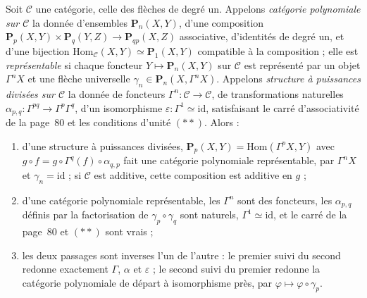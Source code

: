 \begin{encadre}
\begin{theoreme*}
Soit $\mathcal C$ une catégorie, celle des flèches de degré un. Appelons \emph{catégorie polynomiale sur $\mathcal C$} la donnée d'ensembles $\mathbf P_n(X, Y)$, d'une composition $\mathbf P_p(X, Y) \times \mathbf P_q(Y, Z) \to \mathbf P_{qp}(X, Z)$ associative, d'identités de degré un, et d'une bijection $\mathrm{Hom}_{\mathcal C}(X, Y) \simeq \mathbf P_1(X, Y)$ compatible à la composition ; elle est \emph{représentable} si chaque foncteur $Y \mapsto \mathbf P_n(X, Y)$ sur $\mathcal C$ est représenté par un objet $\Gamma^n X$ et une flèche universelle $\gamma_n \in \mathbf P_n(X, \Gamma^n X)$. Appelons \emph{structure à puissances divisées sur $\mathcal C$} la donnée de foncteurs $\Gamma^n : \mathcal C \to \mathcal C$, de transformations naturelles $\alpha_{p,q} : \Gamma^{pq} \to \Gamma^p\Gamma^q$, d'un isomorphisme $\varepsilon : \Gamma^1 \simeq \mathrm{id}$, satisfaisant le carré d'associativité de la page~80 et les conditions d'unité $(**)$. Alors :
\begin{enumerate}
\item d'une structure à puissances divisées, $\mathbf P_p(X, Y) = \mathrm{Hom}(\Gamma^p X, Y)$ avec $g \circ f = g \circ \Gamma^q(f) \circ \alpha_{q,p}$ fait une catégorie polynomiale représentable, par $\Gamma^n X$ et $\gamma_n = \mathrm{id}$ ; si $\mathcal C$ est additive, cette composition est additive en $g$ ;
\item d'une catégorie polynomiale représentable, les $\Gamma^n$ sont des foncteurs, les $\alpha_{p,q}$ définis par la factorisation de $\gamma_p \circ \gamma_q$ sont naturels, $\Gamma^1 \simeq \mathrm{id}$, et le carré de la page~80 et $(**)$ sont vrais ;
\item les deux passages sont inverses l'un de l'autre : le premier suivi du second redonne exactement $\Gamma$, $\alpha$ et $\varepsilon$ ; le second suivi du premier redonne la catégorie polynomiale de départ à isomorphisme près, par $\varphi \mapsto \varphi \circ \gamma_p$.
\end{enumerate}
\end{theoreme*}
\end{encadre}
